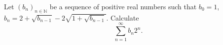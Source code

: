 Let $(b_{n})_{n\in \mathbb{N}}$ be a sequence of positive real numbers such that $b_{0}=1$,
$b_{n}=2+\sqrt{b_{n-1}}-2\sqrt{1+\sqrt{b_{n-1}}}$. Calculate
$$\sum_{n=1}^{\infty}b_{n}2^{n}.$$